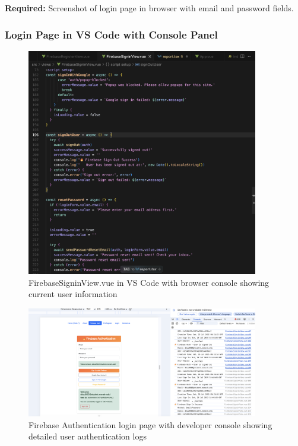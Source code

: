 \documentclass[11pt,a4paper]{article}
\begin{document}
\textbf{Required:} Screenshot of login page in browser with email and password fields.

\subsubsection{Login Page in VS Code with Console Panel}

\begin{figure}[H]
     \centering
     \includegraphics[width=0.9\textwidth]{login_vscode_console.png}
     \caption{FirebaseSigninView.vue in VS Code with browser console showing current user information}
     \label{fig:login_vscode_console}
\end{figure}

\begin{figure}[H]
     \centering
     \includegraphics[width=0.9\textwidth]{Signin_console.png}
     \caption{Firebase Authentication login page with developer console showing detailed user authentication logs}
     \label{fig:signin_console}
\end{figure}
\end{document}
